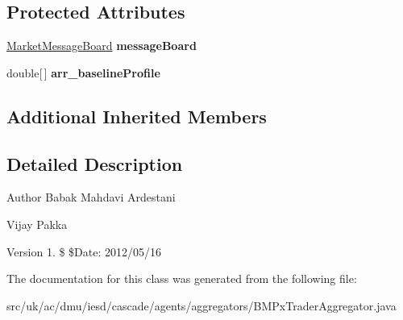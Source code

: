 \subsection*{Protected Attributes}
\begin{DoxyCompactItemize}
\item 
\hypertarget{classuk_1_1ac_1_1dmu_1_1iesd_1_1cascade_1_1agents_1_1aggregators_1_1_b_m_px_trader_aggregator_a51417e3e8cfb6def65bdf9728c924b57}{\hyperlink{classuk_1_1ac_1_1dmu_1_1iesd_1_1cascade_1_1market_1_1astem_1_1operators_1_1_market_message_board}{Market\-Message\-Board} {\bfseries message\-Board}}\label{classuk_1_1ac_1_1dmu_1_1iesd_1_1cascade_1_1agents_1_1aggregators_1_1_b_m_px_trader_aggregator_a51417e3e8cfb6def65bdf9728c924b57}

\item 
\hypertarget{classuk_1_1ac_1_1dmu_1_1iesd_1_1cascade_1_1agents_1_1aggregators_1_1_b_m_px_trader_aggregator_ac5ca45ce34e7d68757bded719fe19007}{double\mbox{[}$\,$\mbox{]} {\bfseries arr\-\_\-baseline\-Profile}}\label{classuk_1_1ac_1_1dmu_1_1iesd_1_1cascade_1_1agents_1_1aggregators_1_1_b_m_px_trader_aggregator_ac5ca45ce34e7d68757bded719fe19007}

\end{DoxyCompactItemize}
\subsection*{Additional Inherited Members}


\subsection{Detailed Description}
\begin{DoxyAuthor}{Author}
Babak Mahdavi Ardestani 

Vijay Pakka 
\end{DoxyAuthor}
\begin{DoxyVersion}{Version}
1. \$ \$\-Date\-: 2012/05/16 
\end{DoxyVersion}


The documentation for this class was generated from the following file\-:\begin{DoxyCompactItemize}
\item 
src/uk/ac/dmu/iesd/cascade/agents/aggregators/B\-M\-Px\-Trader\-Aggregator.\-java\end{DoxyCompactItemize}
